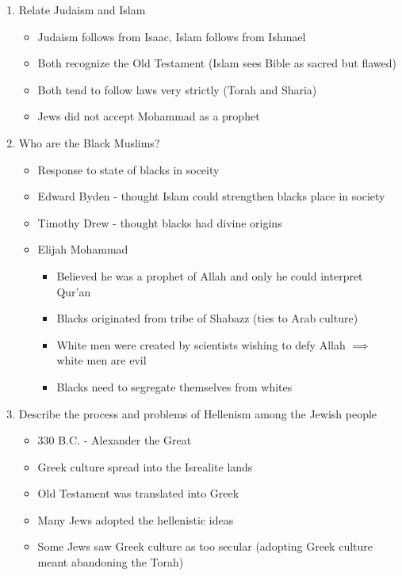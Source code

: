 \documentclass[8pt]{article}
\begin{document}
\begin{enumerate}
        \item Relate Judaism and Islam
            \begin{itemize}
                \item Judaism follows from Isaac, Islam follows from Ishmael
                \item Both recognize the Old Testament (Islam sees Bible as sacred but flawed)
                \item Both tend to follow laws very strictly (Torah and Sharia)
                \item Jews did not accept Mohammad as a prophet
            \end{itemize}

        \item Who are the Black Muslims?
            \begin{itemize}
                \item Response to state of blacks in soceity
                \item Edward Byden - thought Islam could strengthen blacks place in society
                \item Timothy Drew - thought blacks had divine origins
                \item Elijah Mohammad
                \begin{itemize}
                    \item Believed he was a prophet of Allah and only he could interpret Qur'an
                    \item Blacks originated from tribe of Shabazz (ties to Arab culture)
                    \item White men were created by scientists wishing to defy Allah $\implies$ white men are evil
                    \item Blacks need to segregate themselves from whites
                \end{itemize}
            \end{itemize}

        \item Describe the process and problems of Hellenism among the Jewish people
            \begin{itemize}
                \item 330 B.C. - Alexander the Great
                \item Greek culture spread into the Isrealite lands
                \item Old Testament was translated into Greek
                \item Many Jews adopted the hellenistic ideas
                \item Some Jews saw Greek culture as too secular (adopting Greek culture meant abandoning the Torah)
            \end{itemize}


\end{enumerate}
\end{document}
